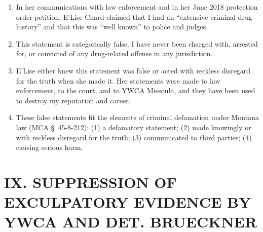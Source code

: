 \documentclass[12pt,letterpaper]{article}
\begin{document}
\begin{enumerate}

\item In her communications with law enforcement and in her June 2018 protection order petition, E'Lise Chard claimed that I had an ``extensive criminal drug history'' and that this was ``well known'' to police and judges.

\item This statement is categorically false. I have never been charged with, arrested for, or convicted of any drug-related offense in any jurisdiction.

\item E'Lise either knew this statement was false or acted with reckless disregard for the truth when she made it. Her statements were made to law enforcement, to the court, and to YWCA Missoula, and they have been used to destroy my reputation and career.

\item These false statements fit the elements of criminal defamation under Montana law (MCA \S~45-8-212): (1) a defamatory statement; (2) made knowingly or with reckless disregard for the truth; (3) communicated to third parties; (4) causing serious harm.

\end{enumerate}


\section*{IX. SUPPRESSION OF EXCULPATORY EVIDENCE BY YWCA AND DET. BRUECKNER}
\end{document}
